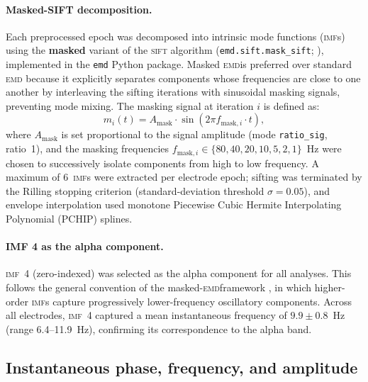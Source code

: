 \documentclass[11pt, a4paper]{article}
\newcommand{\imf}{\textsc{imf}}
\newcommand{\emd}{\textsc{emd}}
\begin{document}
\paragraph{Masked-SIFT decomposition.}
Each preprocessed epoch was decomposed into intrinsic mode functions
(\imf{}s) using the \textbf{masked} variant of the \textsc{sift} algorithm
(\texttt{emd.sift.mask\_sift}; \citealt{quinn2021within}), implemented in the
\texttt{emd} Python package. Masked \emd is preferred over standard \emd
because it explicitly separates components whose frequencies are close to
one another by interleaving the sifting iterations with sinusoidal masking
signals, preventing mode mixing. The masking signal at iteration $i$ is
defined as:
%
\begin{equation}
  m_i(t) = A_{\text{mask}} \cdot \sin(2\pi f_{\text{mask},i} \cdot t),
  \label{eq:mask}
\end{equation}
%
where $A_{\text{mask}}$ is set proportional to the signal amplitude
(mode \texttt{ratio\_sig}, ratio~1), and the masking frequencies
$f_{\text{mask},i} \in \{80, 40, 20, 10, 5, 2, 1\}$~Hz were chosen
to successively isolate components from high to low frequency. A
maximum of 6~\imf{}s were extracted per electrode epoch; sifting was
terminated by the Rilling stopping criterion (standard-deviation
threshold $\sigma = 0.05$), and envelope interpolation used
monotone Piecewise Cubic Hermite Interpolating Polynomial (PCHIP) splines.

\paragraph{IMF 4 as the alpha component.}
\imf{}~4 (zero-indexed) was selected as the alpha component for all
analyses. This follows the general convention of the masked-\emd framework
\citep{quinn2021within}, in which higher-order \imf{}s capture progressively
lower-frequency oscillatory components. Across all electrodes, \imf{}~4
captured a mean instantaneous frequency of $9.9 \pm 0.8$~Hz
(range 6.4--11.9~Hz), confirming its correspondence to the alpha band.

\subsection{Instantaneous phase, frequency, and amplitude}
\end{document}
